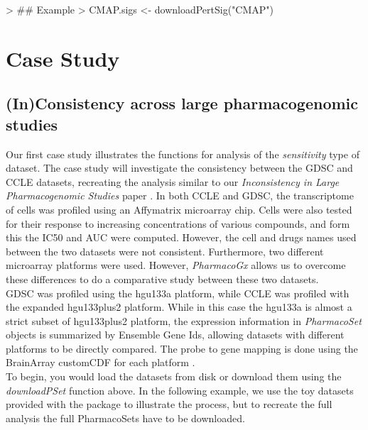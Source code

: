 \documentclass[11pt]{article}
\begin{document}
\begin{Schunk}
\begin{Sinput}
> ## Example
> CMAP.sigs <- downloadPertSig("CMAP")
\end{Sinput}
\end{Schunk}

\section{Case Study}

\subsection{(In)Consistency across large pharmacogenomic studies}
Our first case study illustrates the functions for analysis of the \textit{sensitivity} type of dataset. The case study will investigate the consistency between the GDSC and CCLE datasets, recreating the analysis similar to our \textit{Inconsistency in Large Pharmacogenomic Studies} paper \cite{haibe-kains_inconsistency_2013}. In both CCLE and GDSC, the transcriptome of cells was profiled using an Affymatrix microarray chip. Cells were also tested for their response to increasing concentrations of various compounds, and form this the IC50 and AUC were computed. However, the cell and drugs names used between the two datasets were not consistent. Furthermore, two different microarray platforms were used. However, \textit{PharmacoGx} allows us to overcome these differences to do a comparative study between these two datasets. \\


GDSC was profiled using the hgu133a platform, while CCLE was profiled with the expanded hgu133plus2 platform. While in this case the hgu133a is almost a strict subset of hgu133plus2 platform, the expression information in \textit{PharmacoSet} objects is summarized by Ensemble Gene Ids, allowing datasets with different platforms to be directly compared. The probe to gene mapping is done using the BrainArray customCDF for each platform \cite{sabatti_thresholding_2002}.\\

To begin, you would load the datasets from disk or download them using the \textit{downloadPSet} function above. In the following example, we use the toy datasets provided with the package to illustrate the process, but to recreate the full analysis the full PharmacoSets have to be downloaded.\\
\end{document}

